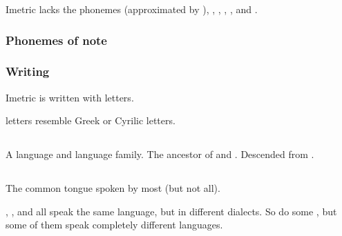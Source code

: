 Imetric lacks the phonemes \txipa{[b]} (approximated by \txipa{[v]}), \txipa{[T]}, \txipa{[x]}, \txipa{[\c c]}, \txipa{[S]}, \txipa{[z]} and \txipa{[Z]}. 









\begin{pronunciationenvironment}{\subsubsection{Phonemes of note}}
\end{pronunciationenvironment}





\subsubsection{Writing}
Imetric is written with {\Ortaican{} letters}. 

\Ortaican{} letters resemble Greek or Cyrilic letters. 









\subsection{\Ortaican}
A \scathaese language and language family. 
The ancestor of  and . 
Descended from . 









\subsection{\Resphan}
The common tongue spoken by most \resphain{} (but not all). 

\Mystraacht, \CiriathSepher, \TiphredSerah{} and \Kezerad{} all speak the same language, but in different dialects. 
So do some \Baelzerach, but some of them speak completely different languages. 

